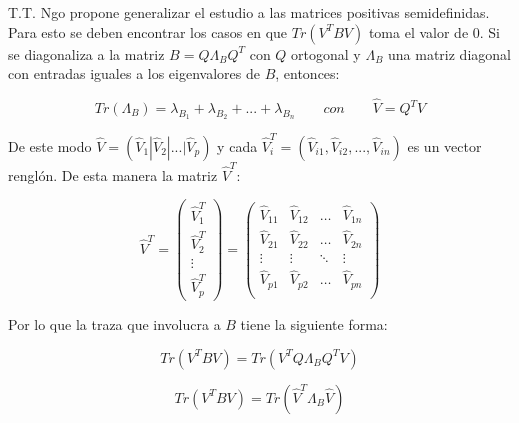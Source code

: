 T.T. Ngo propone generalizar el estudio a las matrices positivas semidefinidas. Para esto se deben encontrar los casos en que $Tr(V^T B V)$ toma el valor de $0$. Si se diagonaliza a la matriz $B = Q \Lambda_{B} Q^T$ con $Q$ ortogonal y $\Lambda_{B}$ una matriz diagonal con entradas iguales a los eigenvalores de $B$, entonces:

\begin{equation*}
Tr(\Lambda_{B}) = \lambda_{B_1}+ \lambda_{B_2}+ ... +\lambda_{B_n} \qquad con \qquad \widehat{V} = Q^T V
\end{equation*}



De este modo $\widehat{V} = (\widehat{V}_1 | \widehat{V}_2 | ... | \widehat{V}_p)$ y cada $\widehat{V}_i^T = (\widehat{V}_{i1}, \widehat{V}_{i2}, ..., \widehat{V}_{in})$ es un vector renglón. De esta manera la matriz $\widehat{V}^T$:

\begin{equation*}
\widehat{V}^T = 	
\left(\!
    \begin{array}{c}
      \widehat{V}_1^T\\
      \widehat{V}_2^T\\
      \vdots \\
      \widehat{V}_p^T
    \end{array}
  \!\right)   = 
\left(\!
    \begin{array}{cccc}
      \widehat{V}_{11} & \widehat{V}_{12} & \hdots & \widehat{V}_{1n}\\
      \widehat{V}_{21} & \widehat{V}_{22} & \hdots & \widehat{V}_{2n}\\
      \vdots &  \vdots &\ddots & \vdots\\
      \widehat{V}_{p1} & \widehat{V}_{p2} & \hdots & \widehat{V}_{pn}\\
    \end{array}
  \!\right) 
\end{equation*}

Por lo que la traza que involucra a $B$ tiene la siguiente forma:

\begin{equation*}
Tr(V^T B V) = Tr(V^T Q \Lambda_{B} Q^T V) 	
\end{equation*}

\begin{equation*}
Tr(V^T B V)  = Tr(\widehat{V}^T \Lambda_{B} \widehat{V})
\end{equation*}

